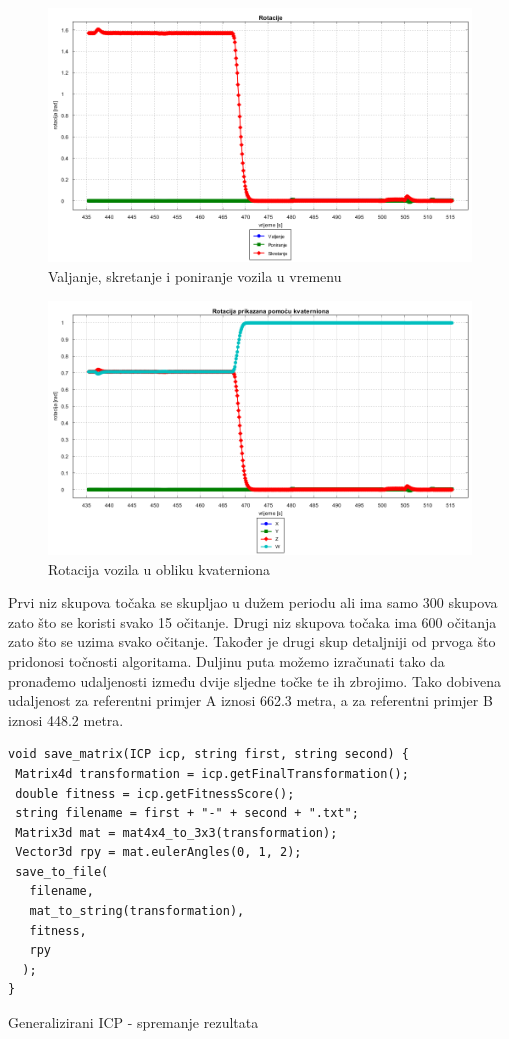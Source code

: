 \begin{figure}[H]
  \includegraphics[scale=0.35]{images/rotacija_vrijeme2.png}
  \caption{Valjanje, skretanje i poniranje vozila u vremenu}
  \label{fig:gt2_rot_vr}
\end{figure}
\begin{figure}[H]
  \includegraphics[scale=0.35]{images/rotacija_kvaterni2.png}
  \caption{Rotacija vozila u obliku kvaterniona}
  \label{fig:gt2_rot_kv}
\end{figure}
Prvi niz skupova točaka se skupljao u dužem periodu ali ima samo 300 skupova zato što se koristi svako 15 očitanje. Drugi niz skupova točaka ima 600 očitanja zato što se uzima svako očitanje. Također je drugi skup detaljniji od prvoga što pridonosi točnosti algoritama. Duljinu puta možemo izračunati tako da pronađemo udaljenosti između dvije sljedne točke te ih zbrojimo. Tako dobivena udaljenost za referentni primjer A iznosi 662.3 metra, a za referentni primjer B iznosi 448.2 metra.

\begin{listing}[H]
  \begin{verbatim}
void save_matrix(ICP icp, string first, string second) {
 Matrix4d transformation = icp.getFinalTransformation();
 double fitness = icp.getFitnessScore();
 string filename = first + "-" + second + ".txt";
 Matrix3d mat = mat4x4_to_3x3(transformation);
 Vector3d rpy = mat.eulerAngles(0, 1, 2);
 save_to_file(
   filename,
   mat_to_string(transformation),
   fitness,
   rpy
  );
}
  \end{verbatim}
  \caption{Generalizirani ICP - spremanje rezultata}
  \label{coderef:gen_icp_save_matrix}
\end{listing}

